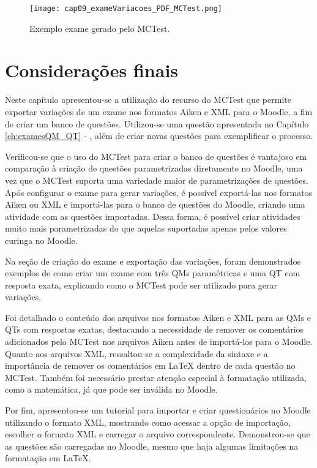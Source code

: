\begin{figure}[!ht]
\centering
  \texttt{[image: cap09\_exameVariacoes\_PDF\_MCTest.png]}
  \caption{Exemplo exame gerado pelo MCTest.}
  \label{fig:cap09_exameVariacoes_PDF_MCTest}
\end{figure}

\section{Considerações finais} 

Neste capítulo apresentou-se a utilização do recurso do MCTest que permite exportar variações de um exame nos formatos Aiken e XML para o Moodle, a fim de criar um banco de questões. Utilizou-se uma questão apresentada no Capítulo \ref{ch:examesQM_QT} - , além de criar novas questões para exemplificar o processo.

Verificou-se que o uso do MCTest para criar o banco de questões é vantajoso em comparação à criação de questões parametrizadas diretamente no Moodle, uma vez que o MCTest suporta uma variedade maior de parametrizações de questões. Após configurar o exame para gerar variações, é possível exportá-las nos formatos Aiken ou XML e importá-las para o banco de questões do Moodle, criando uma atividade com as questões importadas. Dessa forma, é possível criar atividades muito mais parametrizadas do que aquelas suportadas apenas pelos valores curinga no Moodle.

Na seção de criação do exame e exportação das variações, foram demonstrados exemplos de como criar um exame com três QMs paramétricas e uma QT com resposta exata, explicando como o MCTest pode ser utilizado para gerar variações.

Foi detalhado o conteúdo dos arquivos nos formatos Aiken e XML para as QMs e QTs com respostas exatas, destacando a necessidade de remover os comentários adicionados pelo MCTest nos arquivos Aiken antes de importá-los para o Moodle. Quanto aos arquivos XML, ressaltou-se a complexidade da sintaxe e a importância de remover os comentários em \LaTeX{} dentro de cada questão no MCTest. Também foi necessário prestar atenção especial à formatação utilizada, como a matemática, já que pode ser inválida no Moodle.

Por fim, apresentou-se um tutorial para importar e criar questionários no Moodle utilizando o formato XML, mostrando como acessar a opção de importação, escolher o formato XML e carregar o arquivo correspondente. Demonstrou-se que as questões são carregadas no Moodle, mesmo que haja algumas limitações na formatação em \LaTeX{}.

